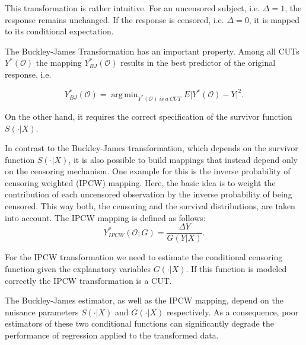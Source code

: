 \documentclass[12pt, a4paper]{article}
\theoremstyle{definition}
\theoremstyle{plain}
\numberwithin{equation}{section}
\numberwithin{figure}{section}
\numberwithin{table}{section}
\DeclareMathOperator*{\argmin}{arg\,min}
\begin{document}
	This transformation is rather intuitive.
	For an uncensored subject, i.e. $\Delta = 1$, the response remains unchanged.
	If the response is censored, i.e. $\Delta = 0$, it is mapped to its conditional expectation. %
	
	
	The Buckley-James Transformation has an important property.
	Among all CUTs $Y^*(\mathcal{O})$ the mapping $Y_{BJ}^* (\mathcal{O})$ results in the best predictor of the original response, i.e.
	
	\begin{equation*}
	Y_{BJ}^* (\mathcal{O})= \argmin_{Y^*(\mathcal{O})~is~a~CUT} E \vert Y^*(\mathcal{O}) - Y \vert ^2.
	\end{equation*}
	
	On the other hand, it requires the correct specification of the survivor function $S(\cdot\vert X)$.

	In contrast to the Buckley-James transformation, which depends on the survivor function $S(\cdot\vert X)$, it is also possible to build mappings that instead depend only on the censoring mechanism.
	One example for this is the inverse probability of censoring weighted (IPCW) mapping.
	Here, the basic idea is to weight the contribution of each uncensored observation by the inverse probability of being censored.
	This way both, the censoring and the survival distributions, are taken into account.
	The IPCW mapping is defined as follows:
	\begin{equation*}
	Y_{IPCW}^*(\mathcal{O}; G) = \frac{\Delta Y}{G(Y \vert X)}.
	\end{equation*}

	For the IPCW transformation we need to estimate the conditional censoring function given the explanatory variables $G(\cdot\vert X)$.
	If this function is modeled correctly the IPCW transformation is a CUT.
	
	
	

	The Buckley-James estimator, as well as the IPCW mapping, depend on the nuisance parameters $S(\cdot\vert X)$ and $G(\cdot\vert X)$ respectively.
	As a consequence, poor estimators of these two conditional functions can significantly degrade the performance of regression applied to the transformed data.
	
\end{document}
